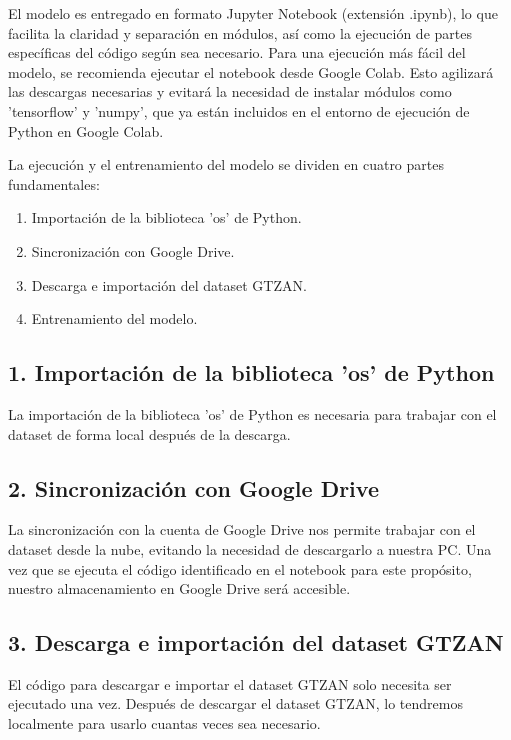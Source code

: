 \documentclass[colorinlistoftodos,twoside,twocolumn,10pt]{article} %
\begin{document}
El modelo es entregado en formato Jupyter Notebook (extensión .ipynb), lo que facilita la claridad y separación en módulos, así como la ejecución de partes específicas del código según sea necesario. Para una ejecución más fácil del modelo, se recomienda ejecutar el notebook desde Google Colab. Esto agilizará las descargas necesarias y evitará la necesidad de instalar módulos como 'tensorflow' y 'numpy', que ya están incluidos en el entorno de ejecución de Python en Google Colab.

La ejecución y el entrenamiento del modelo se dividen en cuatro partes fundamentales:

\begin{enumerate}
\item Importación de la biblioteca 'os' de Python.
\item Sincronización con Google Drive.
\item Descarga e importación del dataset GTZAN.
\item Entrenamiento del modelo.
\end{enumerate}

\subsection*{1. Importación de la biblioteca 'os' de Python}

La importación de la biblioteca 'os' de Python es necesaria para trabajar con el dataset de forma local después de la descarga.

\subsection*{2. Sincronización con Google Drive}

La sincronización con la cuenta de Google Drive nos permite trabajar con el dataset desde la nube, evitando la necesidad de descargarlo a nuestra PC. Una vez que se ejecuta el código identificado en el notebook para este propósito, nuestro almacenamiento en Google Drive será accesible.

\subsection*{3. Descarga e importación del dataset GTZAN}

El código para descargar e importar el dataset GTZAN solo necesita ser ejecutado una vez. Después de descargar el dataset GTZAN, lo tendremos localmente para usarlo cuantas veces sea necesario.
\end{document}
